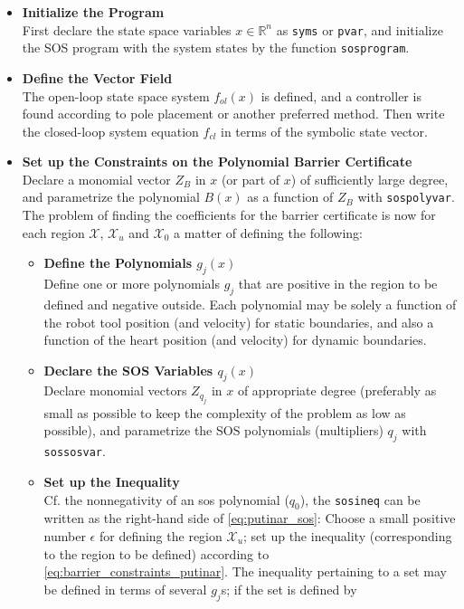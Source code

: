 \renewcommand{\labelitemii}{$\circ$}
\renewcommand{\labelitemiii}{$\bullet$}
\begin{itemize}
\itemsep-0.5mm
\item \textbf{Initialize the Program}\\
First declare the state space variables $x\in\mathbb{R}^n$ as \texttt{syms} or \texttt{pvar}, and initialize the SOS program with the system states by the function \texttt{sosprogram}.
\item \textbf{Define the Vector Field}\\
The open-loop state space system $f_{ol}(x)$ is defined, and a controller is found according to pole placement or another preferred method. Then write the closed-loop system equation $f_{cl}$ in terms of the symbolic state vector.
\item \textbf{Set up the Constraints on the Polynomial Barrier Certificate}\\
Declare a monomial vector $Z_B$ in $x$ (or part of $x$) of sufficiently large degree, and parametrize the polynomial $B(x)$ as a function of $Z_B$ with \texttt{sospolyvar}.  
The problem of finding the coefficients for the barrier certificate is now for each region $\mathcal{X}$, $\mathcal{X}_u$ and $\mathcal{X}_0$ a matter of defining the following:
\vspace*{-1mm}
\begin{itemize}
	\item \textbf{Define the Polynomials $g_j(x)$}\\
	Define one or more polynomials $g_j$ that are positive in the region to be defined and negative outside. Each polynomial may be solely a function of the robot tool position (and velocity) for static boundaries, and also a function of the heart position (and velocity) for dynamic boundaries. 
	\item \textbf{Declare the SOS Variables $q_j(x)$}\\
	Declare monomial vectors $Z_{q_j}$ in $x$ of appropriate degree (preferably as small as possible to keep the complexity of the problem as low as possible), and parametrize the SOS polynomials (multipliers) $q_j$ with \texttt{sossosvar}.
	\item \textbf{Set up the Inequality}\\
	Cf. the nonnegativity of an \gls{sos} polynomial ($q_0$), the \texttt{sosineq} can be written as the right-hand side of \autoref{eq:putinar_sos}: Choose a small positive number $\epsilon$ for defining the region $\mathcal{X}_u$;
	set up the inequality (corresponding to the region to be defined) according to \autoref{eq:barrier_constraints_putinar}. The inequality pertaining to a set may be defined in terms of several $g_j$s; if the set is defined by

\end{itemize}
\end{itemize}
